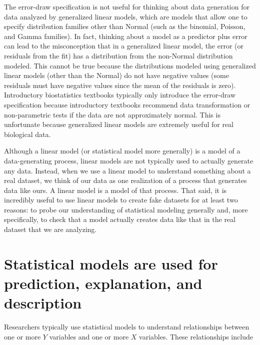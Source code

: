 \documentclass[]{book}
\begin{document}
The error-draw specification is not useful for thinking about data generation for data analyzed by generalized linear models, which are models that allow one to specify distribution families other than Normal (such as the binomial, Poisson, and Gamma families). In fact, thinking about a model as a predictor plus error can lead to the misconception that in a generalized linear model, the error (or residuals from the fit) has a distribution from the non-Normal distribution modeled. This cannot be true because the distributions modeled using generalized linear models (other than the Normal) do not have negative values (some residuals must have negative values since the mean of the residuals is zero). Introductory biostatistics textbooks typically only introduce the error-draw specification because introductory textbooks recommend data transformation or non-parametric tests if the data are not approximately normal. This is unfortunate because generalized linear models are extremely useful for real biological data.

Although a linear model (or statistical model more generally) is a model of a data-generating process, linear models are not typically used to actually generate any data. Instead, when we use a linear model to understand something about a real dataset, we think of our data as one realization of a process that generates data like ours. A linear model is a model of that process. That said, it is incredibly useful to use linear models to create fake datasets for at least two reasons: to probe our understanding of statistical modeling generally and, more specifically, to check that a model actually creates data like that in the real dataset that we are analyzing.

\hypertarget{statistical-models-are-used-for-prediction-explanation-and-description}{%
\section{Statistical models are used for prediction, explanation, and description}\label{statistical-models-are-used-for-prediction-explanation-and-description}}

Researchers typically use statistical models to understand relationships between one or more \(Y\) variables and one or more \(X\) variables. These relationships include
\end{document}
